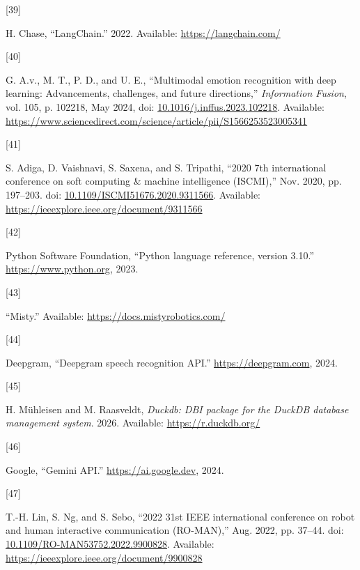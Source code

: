 \documentclass[
  letterpaper,
  DIV=11,
  numbers=noendperiod]{scrartcl}
\newlength{\cslhangindent}
\newlength{\csllabelwidth}
\newenvironment{CSLReferences}[2] %
 {\begin{list}{}{%
  \setlength{\itemindent}{0pt}
  \setlength{\leftmargin}{0pt}
  \setlength{\parsep}{0pt}
  \ifodd #1
   \setlength{\leftmargin}{\cslhangindent}
   \setlength{\itemindent}{-1\cslhangindent}
  \fi
  \setlength{\itemsep}{#2\baselineskip}}}
 {\end{list}}
\newcommand{\CSLLeftMargin}[1]{\parbox[t]{\csllabelwidth}{\strut#1\strut}}
\newcommand{\CSLRightInline}[1]{\parbox[t]{\linewidth - \csllabelwidth}{\strut#1\strut}}
\begin{document}
\begin{CSLReferences}{0}{0}
\CSLLeftMargin{{[}39{]} }%
\CSLRightInline{H. Chase, {``{LangChain}.''} 2022. Available:
\url{https://langchain.com/}}

\CSLLeftMargin{{[}40{]} }%
\CSLRightInline{G. A.v., M. T., P. D., and U. E., {``Multimodal emotion
recognition with deep learning: Advancements, challenges, and future
directions,''} \emph{Information Fusion}, vol. 105, p. 102218, May 2024,
doi:
\href{https://doi.org/10.1016/j.inffus.2023.102218}{10.1016/j.inffus.2023.102218}.
Available:
\url{https://www.sciencedirect.com/science/article/pii/S1566253523005341}}

\CSLLeftMargin{{[}41{]} }%
\CSLRightInline{S. Adiga, D. Vaishnavi, S. Saxena, and S. Tripathi,
{``2020 7th international conference on soft computing \& machine
intelligence (ISCMI),''} Nov. 2020, pp. 197--203. doi:
\href{https://doi.org/10.1109/ISCMI51676.2020.9311566}{10.1109/ISCMI51676.2020.9311566}.
Available: \url{https://ieeexplore.ieee.org/document/9311566}}

\CSLLeftMargin{{[}42{]} }%
\CSLRightInline{Python Software Foundation, {``Python language
reference, version 3.10.''} \url{https://www.python.org}, 2023.}

\CSLLeftMargin{{[}43{]} }%
\CSLRightInline{{``Misty.''} Available:
\url{https://docs.mistyrobotics.com/}}

\CSLLeftMargin{{[}44{]} }%
\CSLRightInline{Deepgram, {``Deepgram speech recognition API.''}
\url{https://deepgram.com}, 2024.}

\CSLLeftMargin{{[}45{]} }%
\CSLRightInline{H. Mühleisen and M. Raasveldt, \emph{Duckdb: DBI package
for the DuckDB database management system}. 2026. Available:
\url{https://r.duckdb.org/}}

\CSLLeftMargin{{[}46{]} }%
\CSLRightInline{Google, {``Gemini API.''} \url{https://ai.google.dev},
2024.}

\CSLLeftMargin{{[}47{]} }%
\CSLRightInline{T.-H. Lin, S. Ng, and S. Sebo, {``2022 31st IEEE
international conference on robot and human interactive communication
(RO-MAN),''} Aug. 2022, pp. 37--44. doi:
\href{https://doi.org/10.1109/RO-MAN53752.2022.9900828}{10.1109/RO-MAN53752.2022.9900828}.
Available: \url{https://ieeexplore.ieee.org/document/9900828}}

\end{CSLReferences}
\end{document}
